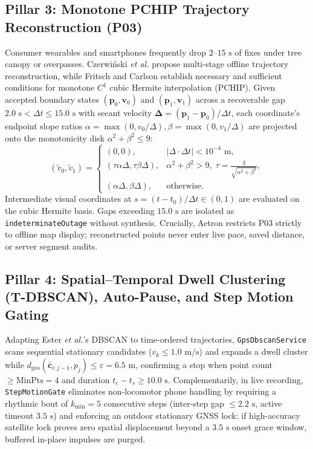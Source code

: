 \documentclass[journal]{IEEEtran}
\begin{document}
\subsection{Pillar 3: Monotone PCHIP Trajectory Reconstruction (P03)}
Consumer wearables and smartphones frequently drop $2\text{--}15\text{ s}$ of fixes under tree canopy or overpasses. Czerwi{\'n}ski \emph{et al.} \cite{czerwinski2026reconstruction} propose multi-stage offline trajectory reconstruction, while Fritsch and Carlson \cite{fritsch1980monotone} establish necessary and sufficient conditions for monotone $C^1$ cubic Hermite interpolation (PCHIP). Given accepted boundary states $(\mathbf{p}_0, \mathbf{v}_0)$ and $(\mathbf{p}_1, \mathbf{v}_1)$ across a recoverable gap $2.0\text{ s} < \Delta t \le 15.0\text{ s}$ with secant velocity $\boldsymbol{\Delta} = (\mathbf{p}_1 - \mathbf{p}_0)/\Delta t$, each coordinate's endpoint slope ratios $\alpha = \max(0, v_0/\Delta), \beta = \max(0, v_1/\Delta)$ are projected onto the monotonicity disk $\alpha^2 + \beta^2 \le 9$:
\begin{equation}
  (\tilde{v}_0, \tilde{v}_1) =
  \begin{cases}
    (0, 0), & |\Delta \cdot \Delta t| < 10^{-4}\text{ m}, \\
    (\tau\alpha\Delta, \tau\beta\Delta), & \alpha^2 + \beta^2 > 9,\; \tau = \frac{3}{\sqrt{\alpha^2+\beta^2}}, \\
    (\alpha\Delta, \beta\Delta), & \text{otherwise}.
  \end{cases}
  \label{eq:pchip}
\end{equation}
Intermediate visual coordinates at $s = (t - t_0)/\Delta t \in (0,1)$ are evaluated on the cubic Hermite basis. Gaps exceeding $15.0\text{ s}$ are isolated as \texttt{indeterminateOutage} without synthesis. Crucially, Aetron restricts P03 strictly to offline map display; reconstructed points never enter live pace, saved distance, or server segment audits.

\subsection{Pillar 4: Spatial--Temporal Dwell Clustering (T-DBSCAN), Auto-Pause, and Step Motion Gating}
Adapting Ester \emph{et al.}'s DBSCAN \cite{ester1996dbscan} to time-ordered trajectories, \texttt{GpsDbscanService} scans sequential stationary candidates ($v_k \le 1.0\text{ m/s}$) and expands a dwell cluster while $d_{\text{geo}}(\bar{\mathbf{c}}_{i:j-1}, p_j) \le \varepsilon = 6.5\text{ m}$, confirming a stop when point count $\ge \mathrm{MinPts} = 4$ and duration $t_e - t_s \ge 10.0\text{ s}$. Complementarily, in live recording, \texttt{StepMotionGate} eliminates non-locomotor phone handling by requiring a rhythmic bout of $k_{\min} = 5$ consecutive steps (inter-step gap $\le 2.2\text{ s}$, active timeout $3.5\text{ s}$) and enforcing an outdoor stationary GNSS lock: if high-accuracy satellite lock proves zero spatial displacement beyond a $3.5\text{ s}$ onset grace window, buffered in-place impulses are purged.
\end{document}
